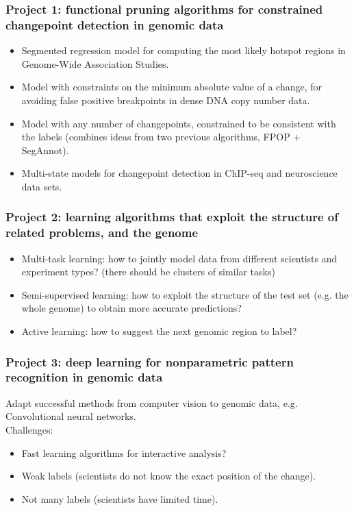 \documentclass{beamer}
\begin{document}
\begin{frame}
  \frametitle{Project 1: functional pruning algorithms for constrained changepoint detection in genomic data}
  \begin{itemize}
  \item Segmented regression model for computing the most likely
    hotspot regions in Genome-Wide Association Studies.
  \item Model with constraints on the minimum absolute value of a
    change, for avoiding false positive breakpoints in dense DNA copy
    number data.
  \item Model with any number of changepoints, constrained to be
    consistent with the labels (combines ideas from two previous
    algorithms, FPOP + SegAnnot).
  \item Multi-state models for changepoint detection in ChIP-seq and
    neuroscience data sets.
  \end{itemize}
\end{frame}

\begin{frame}
  \frametitle{Project 2: learning algorithms that exploit the structure of related problems, and the genome
}
  \begin{itemize}
  \item Multi-task learning: how to jointly model data from different
    scientists and experiment types? (there should be clusters of
    similar tasks)
  \item Semi-supervised learning: how to exploit the structure of the
    test set (e.g. the whole genome) to obtain more accurate
    predictions?
  \item Active learning: how to suggest the next genomic region to
    label?
  \end{itemize}
\end{frame}


\begin{frame}
  \frametitle{Project 3: deep learning for nonparametric pattern recognition in genomic data}
  Adapt successful methods from computer vision to genomic data,
    e.g. Convolutional neural networks. \\
Challenges:
  \begin{itemize}
  \item Fast learning algorithms for interactive analysis?
  \item Weak labels (scientists do not know the exact position of the change).
  \item Not many labels (scientists have limited time).
  \end{itemize}
\end{frame}
\end{document}
